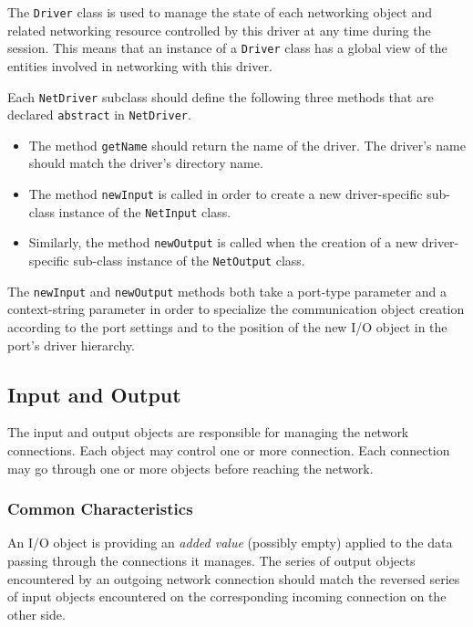 \documentclass[11pt]{book}
\begin{document}
The \texttt{Driver} class is used to manage the state of each
networking object and related networking resource controlled by this
driver at any time during the session. This means that an instance of a
\texttt{Driver} class has a global view of the entities involved in
networking with this driver.

Each \texttt{NetDriver} subclass should define the following three
methods that are declared \texttt{abstract} in \texttt{NetDriver}.
\begin{itemize}

\item The method \texttt{getName} should return the name of the
  driver. The driver's name should match the driver's directory name.

\item The method \texttt{newInput} is called in order to create a new
  driver-specific sub-class instance of the \texttt{NetInput} class.

\item Similarly, the method \texttt{newOutput} is called when the
  creation of a new driver-specific sub-class instance of the
  \texttt{NetOutput} class.

\end{itemize}
The \texttt{newInput} and \texttt{newOutput} methods both take a
port-type parameter and a context-string parameter in order to
specialize the communication object creation according to the port
settings and to the position of the new I/O object in the port's driver
hierarchy.

\subsection{Input and Output}
\label{sec:input-output}

The input and output objects are responsible for managing the network
connections. Each object may control one or more connection. Each
connection may go through one or more objects before reaching the
network.

%
\subsubsection{Common Characteristics}
\label{sec:comm-char}
An I/O object is providing an \emph{added value} (possibly empty)
applied to the data passing through the connections it manages. The
series of output objects encountered by an outgoing network connection
should match the reversed series of input objects encountered on the
corresponding incoming connection on the other side.
\end{document}
